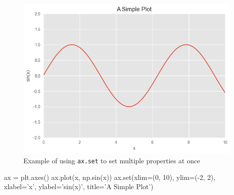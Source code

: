 \begin{figure}[H]
    \centering
    \includegraphics{../Figures/fig26-14.png}
    \caption{Example of using \texttt{ax.set} to set multiple properties at once}
    \label{fig26-14}
\end{figure}

\begin{pyc}
    ax = plt.axes()
    ax.plot(x, np.sin(x))
    ax.set(xlim=(0, 10), ylim=(-2, 2), xlabel='x', ylabel='sin(x)', title='A Simple Plot')
\end{pyc}